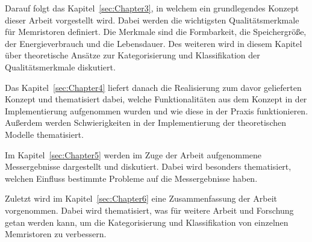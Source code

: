 Darauf folgt das Kapitel~\ref{sec:Chapter3}, in welchem ein grundlegendes Konzept dieser Arbeit vorgestellt wird. Dabei werden die wichtigsten Qualitätsmerkmale für Memristoren definiert. Die Merkmale sind die Formbarkeit, die Speichergröße, der Energieverbrauch und die Lebensdauer. Des weiteren wird in diesem Kapitel über theoretische Ansätze zur Kategorisierung und Klassifikation der Qualitätsmerkmale diskutiert.

Das Kapitel~\ref{sec:Chapter4} liefert danach die Realisierung zum davor gelieferten Konzept und thematisiert dabei, welche Funktionalitäten aus dem Konzept in der Implementierung aufgenommen wurden und wie diese in der Praxis funktionieren. Außerdem werden Schwierigkeiten in der Implementierung der theoretischen Modelle thematisiert.

Im Kapitel~\ref{sec:Chapter5} werden im Zuge der Arbeit aufgenommene Messergebnisse dargestellt und diskutiert. Dabei wird besonders thematisiert, welchen Einfluss bestimmte Probleme auf die Messergebnisse haben.

Zuletzt wird im Kapitel~\ref{sec:Chapter6} eine Zusammenfassung der Arbeit vorgenommen. Dabei wird thematisiert, was für weitere Arbeit und Forschung getan werden kann, um die Kategorisierung und Klassifikation von einzelnen Memristoren zu verbessern.
